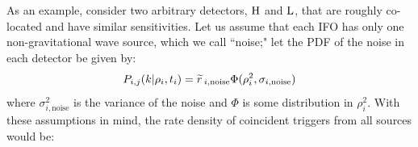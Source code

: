 As an example, consider two arbitrary detectors, $\mathrm{H}$ and $\mathrm{L}$, that are roughly co-located and have similar sensitivities. Let us assume that each \ac{IFO} has only one non-gravitational wave source, which we call ``noise;" let the \ac{PDF} of the noise in each detector be given by:
\begin{equation}
P_{i,j}(k|\rho_i,t_i) = \widetilde{r}\,_{i,\mathrm{noise}}\Phi(\rho_{i}^2, \sigma_{i,\mathrm{noise}})
\end{equation}
where $\sigma_{i,\mathrm{noise}}^2$ is the variance of the noise and $\Phi$ is some distribution in $\rho_i^2$.
With these assumptions in mind, the rate density of coincident triggers from all sources would be:

